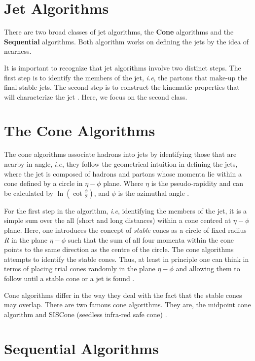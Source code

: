 \section{Jet Algorithms}

There are two broad classes of jet algorithms, the \textbf{Cone} algorithms and the \textbf{Sequential} algorithms. Both algorithm works on defining the jets by the idea of nearness.

It is important to recognize that jet algorithms involve two distinct steps. The first step is to identify the members of the jet, \textit{i.e}, the partons that make-up the final stable jets. The second step is to construct the kinematic properties that will characterize the jet \citep{Berger:2002jt}. Here, we focus on the second class.  

\section{The Cone Algorithms}
The cone algorithms associate hadrons into jets by identifying those that are nearby in angle, $i.e$, they follow the geometrical intuition in defining the jets, where the jet is composed of hadrons and partons whose momenta lie within a cone defined by  a circle in $\eta-\phi$ plane. Where $\eta$ is the pseudo-rapidity and can be calculated by $\ln(\cot \frac{\phi}{2})$, and $\phi$ is the azimuthal angle \citep{Berger:2002jt}. 

For the first step in the algorithm, \textit{i.e}, identifying the members of the jet, it is a simple sum over the all (short and long distances) within a cone centred at $\eta-\phi$ plane. Here, one introduces the concept of \textit{stable} cones as a circle of fixed radius \textit{R} in the plane $\eta-\phi$ such that the sum of all four momenta within the cone points to the same direction as the centre of the circle. The cone algorithms attempts to identify the stable cones. Thus, at least in principle one can think in terms of placing trial cones randomly in the plane $\eta-\phi$  and allowing them to follow until a stable cone or a jet is found \citep{Ellis:2007ib}.

Cone algorithms differ in the way they deal with the fact that the stable cones may overlap. There are two famous cone algorithms. They are, the midpoint cone algorithm and SISCone (seedless infra-red safe cone) \citep{Ellis:2007ib}.  
\section{Sequential Algorithms}

